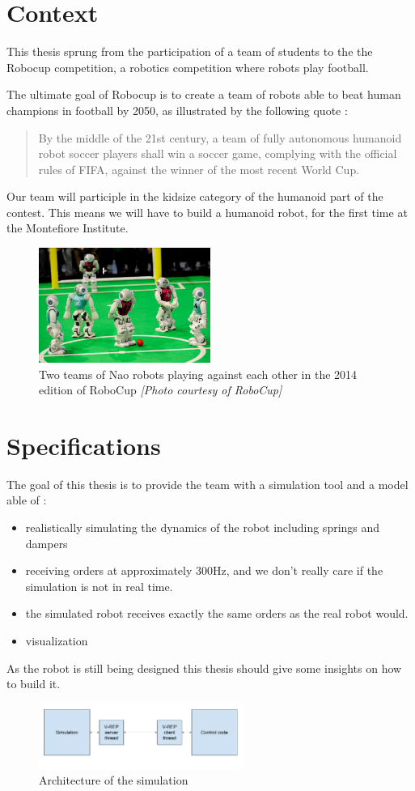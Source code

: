 \section{Context}
This thesis sprung from the participation of a team of students to the the Robocup competition, a robotics competition where robots play football.

The ultimate goal of Robocup is to create a team of robots able to beat human champions in football by 2050, as illustrated by the following quote :
\begin{quote}
By the middle of the 21st century, a team of fully autonomous humanoid robot soccer players shall win a soccer game, complying with the official rules of FIFA, against the winner of the most recent World Cup.
\end{quote}

Our team will participle in the kidsize category of the humanoid part of the contest. This means we will have to build a humanoid robot, for the first time at the Montefiore Institute.

\begin{figure}[htp]
\center
\includegraphics[width=0.5\textwidth]{figures/robocup}
\caption[Two teams of Nao robots playing against each other]{Two teams of Nao robots playing against each other in the 2014 edition of RoboCup \textit{[Photo courtesy of RoboCup]}}
\label{fig:intro_robocup}
\end{figure}

\section{Specifications}
The goal of this thesis is to provide the team with a simulation tool and a model able of :
\begin{itemize}
\item realistically simulating the dynamics of the robot including springs and dampers
\item receiving orders at approximately 300Hz, and we don't really care if the simulation is not in real time.
\item the simulated robot receives exactly the same orders as the real robot would.
\item visualization
\end{itemize}
As the robot is still being designed this thesis should give some insights on how to build it.

\begin{figure}[htp]
\center
\includegraphics[width=0.6\textwidth]{figures/simulation_arch}
\caption[Architecture of the simulation]{Architecture of the simulation}
\label{fig:simul_arch}
\end{figure}
